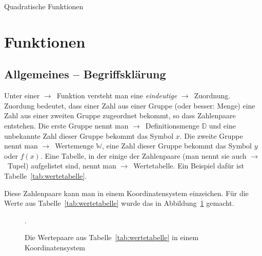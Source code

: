 \documentclass{scrartcl}
\newcommand*\menge[1]{\mathbb{#1}}
\newcommand*\siehe{$\rightarrow$~}
\newcommand*\begriff{\siehe\ac}
\begin{document}
\begin{center}
  \Huge\sffamily Quadratische Funktionen
\end{center}

\tableofcontents

\section{Funktionen}
\subsection{Allgemeines -- Begriffsklärung}

Unter einer \begriff{Funktion} versteht man eine \emph{eindeutige}
\begriff{Zuordnung}.  Zuordung bedeutet, dass einer Zahl aus einer Gruppe
(oder besser: Menge) eine Zahl aus einer zweiten Gruppe zugeordnet bekommt, so
dass Zahlenpaare entstehen.  Die erste Gruppe nennt man
\begriff{Definitionsmenge} $\menge{D}$ und eine unbekannte Zahl dieser Gruppe
bekommt das Symbol $x$.  Die zweite Gruppe nennt man \begriff{Wertemenge}
$\menge{W}$, eine Zahl dieser Gruppe bekommt das Symbol $y$ oder $f(x)$.  Eine
Tabelle, in der einige der Zahlenpaare (man nennt sie auch \begriff{Tupel})
aufgelistet sind, nennt man \begriff{Wertetabelle}.  Ein Beispiel dafür ist
Tabelle~\ref{tab:wertetabelle}.

\begin{table}
  \centering
  \caption{Beispiel für eine Wertetabelle.}
  \label{tab:wertetabelle}
\end{table}

Diese Zahlenpaare kann man in einem Koordinatensystem einzeichen.  Für die
Werte aus Tabelle~\ref{tab:wertetabelle} wurde das in
Abbildung~\ref{fig:wertepaare} gemacht.

\begin{figure}
  \centering
  \caption{Die Wertepaare aus Tabelle~\ref{tab:wertetabelle} in einem
    Koordinatensystem}.
  \label{fig:wertepaare}
\end{figure}
\end{document}
